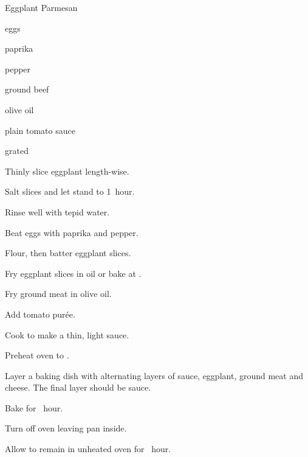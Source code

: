 \begin{recipe}{Eggplant Parmesan}{}{}

\begin{ingredients}
\item {}
\item eggs
\item paprika
\item pepper
\item ground beef
\item olive oil
\item plain tomato sauce
\item grated 
\end{ingredients}

\begin{directions}
\item Thinly slice eggplant length-wise.
\item Salt slices and let stand \half{} to 1~hour.
\item Rinse well with tepid water.
\item Beat eggs with paprika and pepper.
\item Flour, then batter eggplant slices.
\item Fry eggplant slices in oil or bake at .
\item Fry ground meat in olive oil.
\item Add tomato pur\'ee.
\item Cook to make a thin, light sauce.
\item Preheat oven to .
\item Layer a baking dish with alternating layers of sauce, eggplant, ground meat and cheese. The final layer should be sauce.
\item Bake for \half~hour.
\item Turn off oven leaving pan inside.
\item Allow to remain in unheated oven for \half~hour.
\end{directions}

\end{recipe}

